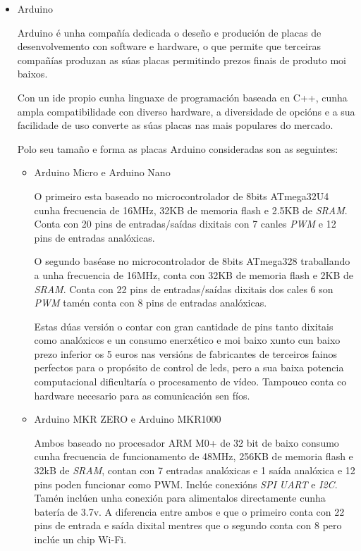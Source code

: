 \begin{itemize}
    \item Arduino

Arduino é unha compañía dedicada o deseño e produción de placas de desenvolvemento con software e hardware, o que permite que terceiras compañías produzan as súas placas permitindo prezos finais de produto moi baixos.

Con un ide propio cunha linguaxe de programación baseada en C++, cunha ampla compatibilidade con diverso hardware, a diversidade de opcións e a sua facilidade de uso converte as súas placas nas mais populares do mercado.

Polo seu tamaño e forma as placas Arduino consideradas son as seguintes:
    \begin{itemize}
        \item Arduino Micro e Arduino Nano

O primeiro esta baseado no microcontrolador de 8bits ATmega32U4 cunha frecuencia de 16MHz, 32KB de memoria flash e 2.5KB de \emph{SRAM}.
Conta con 20 pins de entradas/saídas dixitais con 7 canles \emph{PWM} e 12 pins de entradas analóxicas.

O segundo baséase no microcontrolador de 8bits ATmega328 traballando a unha frecuencia de 16MHz, conta con 32KB de memoria flash e 2KB de \emph{SRAM}. Conta con 22 pins de entradas/saídas dixitais dos cales 6 son \emph{PWM} tamén conta con 8 pins de entradas analóxicas.

Estas dúas versión o contar con gran cantidade de pins tanto dixitais como analóxicos e un consumo enerxético e moi baixo xunto cun baixo prezo inferior os 5 euros nas versións de fabricantes de terceiros fainos perfectos para o propósito de control de leds, pero a sua baixa potencia computacional dificultaría o procesamento de vídeo. Tampouco conta co hardware necesario para as comunicación sen fíos.

        \item Arduino MKR ZERO e Arduino MKR1000

Ambos baseado no procesador ARM M0+ de 32 bit de baixo consumo cunha frecuencia de funcionamento de 48MHz, 256KB de memoria flash e 32kB de \emph{SRAM}, contan con 7 entradas analóxicas e 1 saída analóxica e 12 pins poden funcionar como PWM. Inclúe conexións \emph{SPI} \emph{UART} e \emph{I2C}. Tamén inclúen unha conexión para alimentalos directamente cunha batería de 3.7v. A diferencia entre ambos e que o primeiro conta con 22 pins de entrada e saída dixital mentres que o segundo conta con 8 pero inclúe un chip Wi-Fi.


\end{itemize}
\end{itemize}
